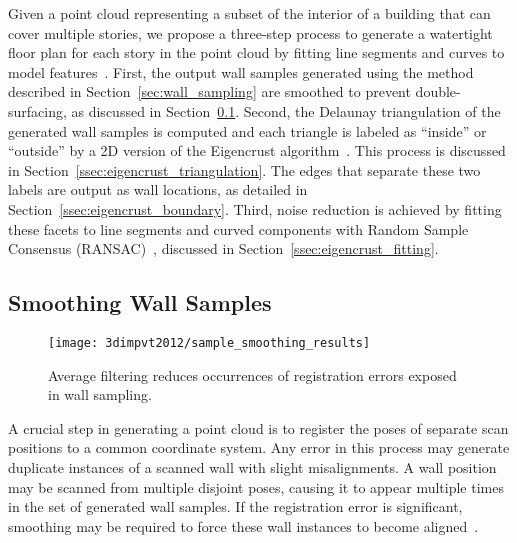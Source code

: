 \documentclass[12pt,onecolumn,oneside]{book}
\begin{document}
Given a point cloud representing a subset of the interior of a building that can cover multiple stories, we propose a three-step process to generate a watertight floor plan for each story in the point cloud by fitting line segments and curves to model features~\cite{Turner12}.  First, the output wall samples generated using the method described in Section~\ref{sec:wall_sampling} are smoothed to prevent double-surfacing, as discussed in Section~\ref{ssec:eigencrust_smoothing}.  Second, the Delaunay triangulation of the generated wall samples is computed and each triangle is labeled as ``inside'' or ``outside'' by a 2D version of the Eigencrust algorithm~\cite{EigencrustShewchuk}.  This process is discussed in Section~\ref{ssec:eigencrust_triangulation}.  The edges that separate these two labels are output as wall locations, as detailed in Section~\ref{ssec:eigencrust_boundary}.  Third, noise reduction is achieved by fitting these facets to line segments and curved components with Random Sample Consensus (RANSAC)~\cite{Ransac}, discussed in Section~\ref{ssec:eigencrust_fitting}.

\subsection{Smoothing Wall Samples}
\label{ssec:eigencrust_smoothing}

\begin{figure}[t]

\begin{minipage}[b]{1.0\linewidth}
  \centering
  \centerline{\texttt{[image: 3dimpvt2012/sample\_smoothing\_results]}}
\end{minipage}

\caption[Smoothing wall samplings.]{Average filtering reduces occurrences of registration errors exposed in wall sampling.}
\label{fig:sample_smoothing_results}

\end{figure}

A crucial step in generating a point cloud is to register the poses of separate scan positions to a common coordinate system.  Any error in this process may generate duplicate instances of a scanned wall with slight misalignments.  A wall position may be scanned from multiple disjoint poses, causing it to appear multiple times in the set of generated wall samples.  If the registration error is significant, smoothing may be required to force these wall instances to become aligned~\cite{Turner12}.
\end{document}
